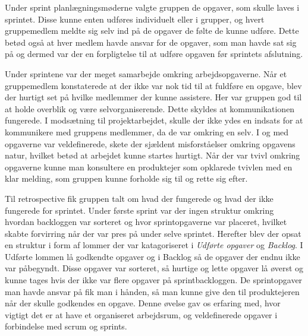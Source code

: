 Under sprint planlægningsmøderne valgte gruppen de opgaver, som skulle laves i sprintet. Disse kunne enten udføres individuelt eller i grupper, og hvert gruppemedlem meldte sig selv ind på de opgaver de følte de kunne udføre. Dette betød også at hver medlem havde ansvar for de opgaver, som man havde sat sig på og dermed var der en forpligtelse til at udføre opgaven før sprintets afslutning. \newline

Under sprintene var der meget samarbejde omkring arbejdsopgaverne. Når et gruppemedlem konstaterede at der ikke var nok tid til at fuldføre en opgave, blev der hurtigt set på hvilke medlemmer der kunne assistere. Her var gruppen god til at holde overblik og være selvorganiserende. Dette skyldes at kommunikationen fungerede. I modsætning til projektarbejdet, skulle der ikke ydes en indsats for at kommunikere med gruppens medlemmer, da de var omkring en selv. 
I og med opgaverne var veldefinerede, skete der sjældent misforståelser omkring opgavens natur, hvilket betød at arbejdet kunne startes hurtigt. Når der var tvivl omkring opgaverne kunne man konsultere en produktejer som opklarede tvivlen med en klar melding, som gruppen kunne forholde sig til og rette sig efter.  \newline

Til retrospective fik gruppen talt om hvad der fungerede og hvad der ikke fungerede for sprintet. Under første sprint var der ingen struktur omkring hvordan backloggen var sorteret og hvor sprintopgaverne var placeret, hvilket skabte forvirring når der var pres på under selve sprintet. Herefter blev der opsat en struktur i form af lommer der var katagoriseret i \textit{Udførte opgaver} og \textit{Backlog}. I Udførte lommen lå godkendte opgaver og i Backlog så de opgaver der endnu ikke var påbegyndt. Disse opgaver var sorteret, så hurtige og lette opgaver lå øverst og kunne tages hvis der ikke var flere opgaver på sprintbackloggen. De sprintopgaver man havde ansvar på fik man i hånden, så man kunne give den til produktejeren når der skulle godkendes en opgave. \newline
Denne øvelse gav os erfaring med, hvor vigtigt det er at have et organiseret arbejdsrum, og veldefinerede opgaver i forbindelse med scrum og sprints.

